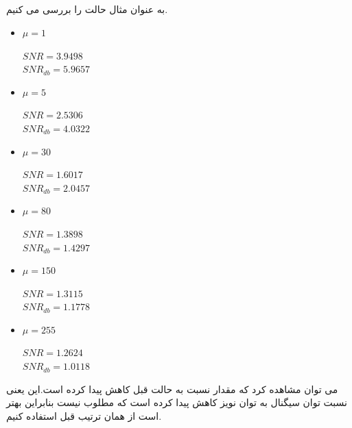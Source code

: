 \documentclass[a4paper]{article}
\begin{document}
\subsection{}
به عنوان مثال حالت  را بررسی می کنیم.
\begin{itemize}
	\item 
	$\mu = 1$
	\begin{flushleft}
		$SNR = 3.9498$\\
		$SNR_{db} = 5.9657$
	\end{flushleft}
	\item 
	$\mu = 5$
	\begin{flushleft}
		$SNR = 2.5306$\\
		$SNR_{db} = 4.0322$
	\end{flushleft}
	\item 
	$\mu = 30$
	\begin{flushleft}
		$SNR = 1.6017$\\
		$SNR_{db} = 2.0457$
	\end{flushleft}
	\item 
	$\mu = 80$
	\begin{flushleft}
		$SNR = 1.3898 $\\
		$SNR_{db} = 1.4297$
	\end{flushleft}
	\item 
	$\mu = 150$
	\begin{flushleft}
		$SNR = 1.3115$\\
		$SNR_{db} = 1.1778$
	\end{flushleft}
	\item 
	$\mu = 255$
	\begin{flushleft}
		$SNR = 1.2624$\\
		$SNR_{db} = 1.0118$
	\end{flushleft}
\end{itemize}
می توان مشاهده کرد که مقدار  نسبت به حالت قبل کاهش پیدا کرده است.این یعنی نسبت توان سیگنال به توان نویز کاهش پیدا کرده است که مطلوب نیست بنابراین بهتر است از همان ترتیب قبل استفاده کنیم.
\end{document}
